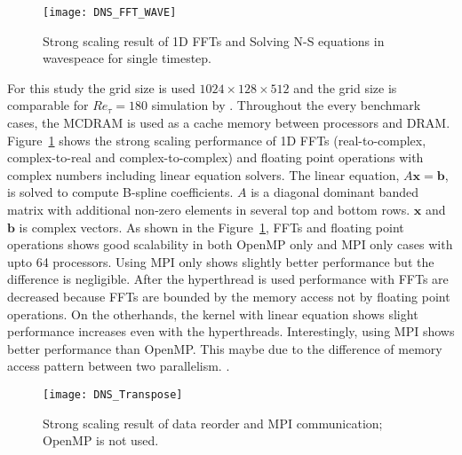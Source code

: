 \begin{figure}[htb]
 \begin{center}
   \texttt{[image: DNS\_FFT\_WAVE]}
   \caption{Strong scaling result of 1D FFTs and Solving N-S equations in wavespeace for single timestep.}
   \label{fig:DNS_strong_scale_fft_wave}
 \end{center}
\end{figure}


For this study the grid size is used $1024\times128\times512$ and the grid size is comparable for $Re_\tau = 180$ simulation by \cite{Kim:1987ub}. Throughout the every benchmark cases, the MCDRAM is used as a cache memory between processors and DRAM. Figure~\ref{fig:DNS_strong_scale_fft_wave} shows the strong scaling performance of 1D FFTs (real-to-complex, complex-to-real and complex-to-complex) and floating point operations with complex numbers including linear equation solvers. The linear equation, $A\mathbf{x} = \mathbf{b}$, is solved to compute B-spline coefficients. $A$ is a diagonal dominant banded matrix with additional non-zero elements in several top and bottom rows. $\mathbf{x}$ and $\mathbf{b}$ is complex vectors. As shown in the Figure~\ref{fig:DNS_strong_scale_fft_wave}, FFTs and floating point operations shows good scalability in both OpenMP only and MPI only cases with upto 64 processors. Using MPI only shows slightly better performance but the difference is negligible. After the hyperthread is used performance with FFTs are decreased because FFTs are bounded by the memory access not by floating point operations. On the otherhands, the kernel with linear equation shows slight performance increases even with the hyperthreads. Interestingly, using MPI shows better performance than OpenMP. This maybe due to the difference of memory access pattern between two parallelism. .


\begin{figure}[htb]
 \begin{center}
   \texttt{[image: DNS\_Transpose]}
   \caption{Strong scaling result of data reorder and MPI communication; OpenMP is not used.}
   \label{fig:DNS_strong_scale_transpose}
 \end{center}
\end{figure}


